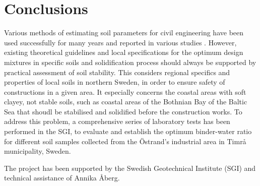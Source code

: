 \documentclass[10pt,twoside,twocolumn,a4paper]{article}
\begin{document}
\section{Conclusions}

Various methods of estimating soil parameters for civil engineering have been used successfully for many years and reported in various studies \cite{Wuetal2021,Grabiec,Lemenkov2021c,Bahar}. However, existing theoretical guidelines and local specifications for the optimum design mixtures in specific soils and solidification process should always be supported by practical assessment of soil stability. This considers regional specifics and properties of local soils in northern Sweden, in order to ensure safety of constructions in a given area. It especially concerns the coastal areas with soft clayey, not stable soils, such as coastal areas of the Bothnian Bay of the Baltic Sea that shoudl be stabilised and solidified before the construction works. To address this problem, a comprehensive series of laboratory tests has been performed in the SGI, to evaluate and establish the optimum binder-water ratio for different soil samples collected from the Östrand's industrial area in Timrå municipality, Sweden.

\begin{acknowledgements}
The project has been supported by the Swedish Geotechnical Institute (SGI) and technical assistance of Annika Åberg. 

\end{acknowledgements}

%



\end{document}
